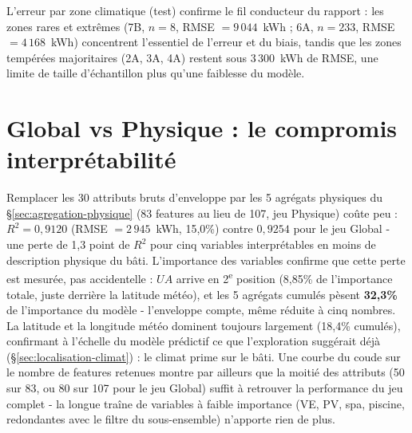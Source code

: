 L'erreur par zone climatique (test) confirme le fil conducteur du rapport : les zones rares et
extrêmes (7B, $n=8$, RMSE $=9\,044$~kWh ; 6A, $n=233$, RMSE $=4\,168$~kWh) concentrent l'essentiel
de l'erreur et du biais, tandis que les zones tempérées majoritaires (2A, 3A, 4A) restent sous
3\,300~kWh de RMSE, une limite de taille d'échantillon plus qu'une faiblesse du modèle.

\section{Global vs Physique : le compromis interprétabilité}
\label{sec:global-vs-physique}
\begin{resultbox}
Remplacer les 30 attributs bruts d'enveloppe par les 5 agrégats physiques du
\S\ref{sec:agregation-physique} (83 features au lieu de 107, jeu \og Physique\fg) coûte peu :
$R^2=0{,}9120$ (RMSE $=2\,945$~kWh, 15,0\%) contre $0{,}9254$ pour le jeu \og Global\fg{} - une
perte de 1,3 point de $R^2$ pour cinq variables interprétables en moins de description physique
du bâti. L'importance des variables confirme que cette perte est mesurée, pas accidentelle : $UA$
arrive en 2\textsuperscript{e} position (8,85\% de l'importance totale, juste derrière la latitude
météo), et les 5 agrégats cumulés pèsent \textbf{32,3\%} de l'importance du modèle - l'enveloppe
compte, même réduite à cinq nombres. La latitude et la longitude météo dominent toujours
largement (18,4\% cumulés), confirmant à l'échelle du modèle prédictif ce que l'exploration
suggérait déjà (\S\ref{sec:localisation-climat}) : le climat prime sur le bâti. Une courbe du
coude sur le nombre de features retenues montre par ailleurs que la moitié des attributs
(50 sur 83, ou 80 sur 107 pour le jeu Global) suffit à retrouver la performance du jeu complet - 
la longue traîne de variables à faible importance (VE, PV, spa, piscine, redondantes avec le
filtre du sous-ensemble) n'apporte rien de plus.
\end{resultbox}

